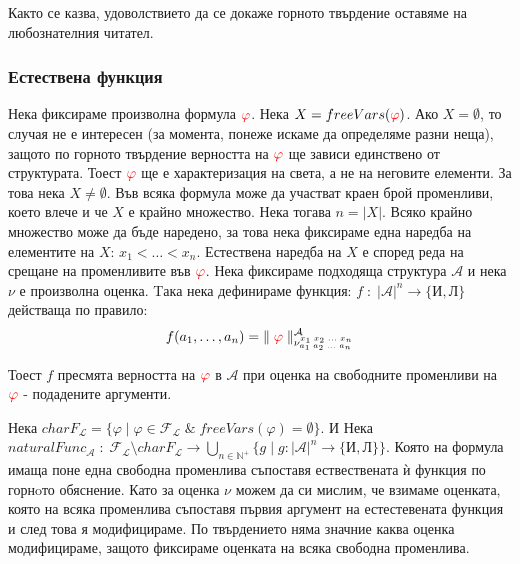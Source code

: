 \documentclass{article}[12pt]
\newcommand{\Lang}{\mathcal{L}}
\begin{document}
\vspace{1cm}

Както се казва, удоволствието да се докаже горното твърдение оставяме на любознателния читател.

\subsubsection{Естествена функция}

Нека фиксираме произволна формула \(\color{red} \varphi\).
Нека \(X = freeVars(\color{red} \varphi \color{black})\).
Ако \(X = \emptyset\), то случая не е интересен (за момента, понеже искаме да определяме разни неща),
защото по горното твърдение верността на \(\color{red} \varphi\) ще зависи единствено от структурата.
Тоест \(\color{red} \varphi\) ще е характеризация на света, а не на неговите елементи.
За това нека \(X \neq \emptyset\). Във всяка формула може да участват краен брой променливи,
което влече и че \(X\) е крайно множество. Нека тогава \(n = |X|\). Всяко крайно множество може да бъде наредено,
за това нека фиксираме една наредба на елементите на \(X\): \(x_1 < \dots < x_{n}\).
Естествена наредба на \(X\) е според реда на срещане на променливите във \(\color{red} \varphi\).
Нека фиксираме подходяща структура \(\mathcal{A}\) и нека \(\nu\) е произволна оценка.
Tака нека дефинираме функция: \(f \; : \; |\mathcal{A}|^n \to \{\text{И}, \text{Л}\}\) действаща по правило:
\begin{align*}
f(a_1, \dots, a_n) = \| \; \color{red} \varphi \color{black} \; \|^{\mathcal{A}}_{\nu^{x_1 \; x_2 \; \dots \; x_n}_{a_1 \; a_2 \; \dots \; a_n}}
\end{align*}

Тоест \(f\) пресмята верността на \(\color{red} \varphi\) в \(\mathcal{A}\) при оценка на свободните променливи на \(\color{red} \varphi\) - подадените аргументи.

\vspace{1cm}

Нека \(charF_\Lang = \{\varphi \; | \; \varphi \in \mathcal{F}_\Lang \; \& \; freeVars(\varphi) = \emptyset\}\).
И Нека \\
\(naturalFunc_{\mathcal{A}} \; : \; \mathcal{F}_\Lang \setminus charF_\Lang \to \displaystyle\bigcup_{n \in \mathbb{N}^+} \{g \; | \; g : |\mathcal{A}|^n \to \{\text{И}, \text{Л}\} \}  \).
Която на формула имаща поне една свободна променлива съпоставя ествествената ѝ функция по горнoто обяснение.
Като за оценка \(\nu\) можем да си мислим, че взимаме оценката, която на всяка променлива съпоставя първия аргумент на естестевената функция и след това я модифицираме.
По твърдението няма значние каква оценка модифицираме, защото фиксираме оценката на всяка свободна променлива.
\end{document}
